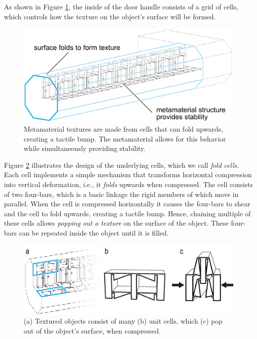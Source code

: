 As shown in Figure \ref{fig:2-door-handle-inside}, the inside of the door handle consists of a grid of cells, which controls how the texture on the object's surface will be formed.

\begin{figure} [h]  
    \includegraphics[width=\textwidth]{chapters/metamaterial-textures-FIG/2-door-handle-inside.pdf}
    \caption[Short figure name.]{Metamaterial textures are made from cells that can fold upwards, creating a tactile bump. The metamaterial allows for this behavior while simultaneously providing stability. 
    \label{fig:2-door-handle-inside}}
\end{figure}

Figure \ref{fig:3-door-handle-fold-cell} illustrates the design of the underlying cells, which we call \textit{fold cells.} Each cell implements a simple mechanism that transforms horizontal compression into vertical deformation, i.e., it \textit{folds} upwards when compressed. The cell consists of two four-bars, which is a basic linkage the rigid members of which move in parallel. When the cell is compressed horizontally it causes the four-bars to shear and the cell to fold upwards, creating a tactile bump. Hence, chaining multiple of these cells allows \textit{popping out a texture} on the surface of the object. These four-bars can be repeated inside the object until it is filled.

\begin{figure} [h]  
    \includegraphics[width=\textwidth]{chapters/metamaterial-textures-FIG/3-door-handle-fold-cell.pdf}
    \caption[Short figure name.]{(a) Textured objects consist of many (b) unit cells, which (c) pop out of the object's surface, when compressed. 
    \label{fig:3-door-handle-fold-cell}}
\end{figure}

